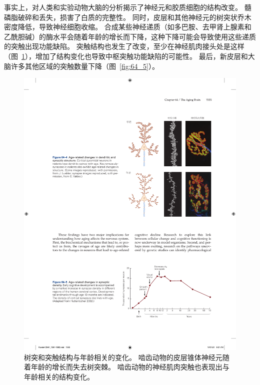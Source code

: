 事实上，对人类和实验动物大脑的分析揭示了神经元和胶质细胞的结构改变。
髓磷脂破碎和丢失，损害了白质的完整性。
同时，皮层和其他神经元的树突状乔木密度降低，导致神经细胞收缩。
合成某些神经递质（如多巴胺、去甲肾上腺素和乙酰胆碱）的酶水平会随着年龄的增长而下降，这种下降可能会导致使用这些递质的突触出现功能缺陷。
突触结构也发生了改变，至少在神经肌肉接头处是这样（图~\ref{fig:64_4}），增加了结构变化也导致中枢突触功能缺陷的可能性。
最后，新皮层和大脑许多其他区域的突触数量下降（图~\ref{fig:64_5}）。


\begin{figure}[htbp]
	\centering
	\includegraphics[width=0.66\linewidth]{chap64/fig_64_4}
	\caption{树突和突触结构与年龄相关的变化。
		啮齿动物的皮层锥体神经元随着年龄的增长而失去树突棘。
		啮齿动物的神经肌肉突触也表现出与年龄相关的结构变化。}
	\label{fig:64_4}
\end{figure}


